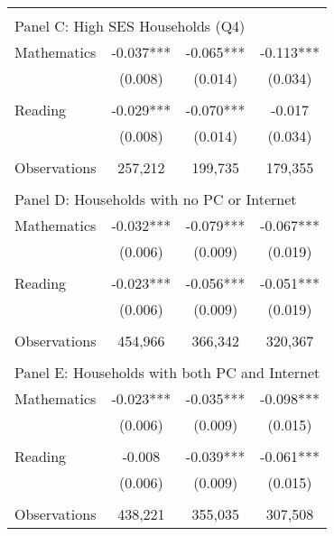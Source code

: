 {\begin{tabular}{lccc}
&  &  &   \\
\multicolumn{4}{l}{Panel C: High SES Households (Q4)} \\
\hspace{3mm}Mathematics&      -0.037***&      -0.065***&      -0.113***\\
                    &     (0.008)   &     (0.014)   &     (0.034)   \\
 
&  &  &   \\
\hspace{3mm}Reading &      -0.029***&      -0.070***&      -0.017   \\
                    &     (0.008)   &     (0.014)   &     (0.034)   \\
                    &               &               &               \\
\hspace{3mm}Observations&     257,212   &     199,735   &     179,355   \\
 
&  &  &   \\
\multicolumn{4}{l}{Panel D: Households with no PC or Internet} \\
\hspace{3mm}Mathematics&      -0.032***&      -0.079***&      -0.067***\\
                    &     (0.006)   &     (0.009)   &     (0.019)   \\
 
&  &  &   \\
\hspace{3mm}Reading &      -0.023***&      -0.056***&      -0.051***\\
                    &     (0.006)   &     (0.009)   &     (0.019)   \\
                    &               &               &               \\
\hspace{3mm}Observations&     454,966   &     366,342   &     320,367   \\
 
&  &  &   \\
\multicolumn{4}{l}{Panel E: Households with both PC and Internet} \\
\hspace{3mm}Mathematics&      -0.023***&      -0.035***&      -0.098***\\
                    &     (0.006)   &     (0.009)   &     (0.015)   \\
 
&  &  &   \\
\hspace{3mm}Reading &      -0.008   &      -0.039***&      -0.061***\\
                    &     (0.006)   &     (0.009)   &     (0.015)   \\
                    &               &               &               \\
\hspace{3mm}Observations&     438,221   &     355,035   &     307,508   \\
 

\bottomrule
\end{tabular}
}
